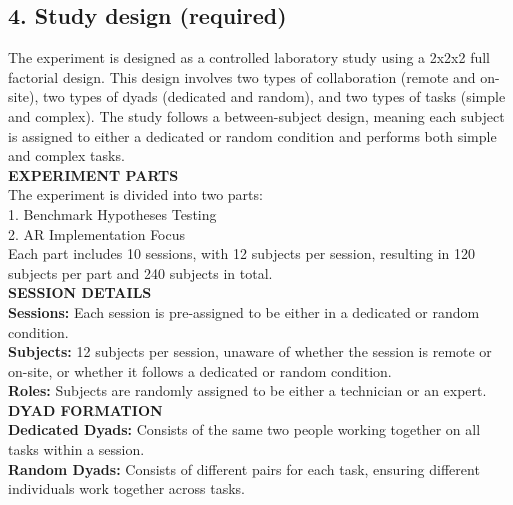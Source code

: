 \documentclass[A4,11pt]{article}
\renewcommand{\~}[1]{\tilde{#1}}
\renewcommand{\-}[1]{\overline{#1}}
\begin{document}
\subsection*{4. Study design (required) }
The experiment is designed as a controlled laboratory study using a 2x2x2 full factorial design. This design involves two types of collaboration (remote and on-site), two types of dyads (dedicated and random), and two types of tasks (simple and complex). The study follows a between-subject design, meaning each subject is assigned to either a dedicated or random condition and performs both simple and complex tasks.\\

\textbf{EXPERIMENT PARTS}\\
The experiment is divided into two parts:\\
1. Benchmark Hypotheses Testing\\
2. AR Implementation Focus\\

Each part includes 10 sessions, with 12 subjects per session, resulting in 120 subjects per part and 240 subjects in total.\\

\textbf{SESSION DETAILS}\\
\textbf{Sessions:} Each session is pre-assigned to be either in a dedicated or random condition.\\
\textbf{Subjects:} 12 subjects per session, unaware of whether the session is remote or on-site, or whether it follows a dedicated or random condition.\\
\textbf{Roles:} Subjects are randomly assigned to be either a technician or an expert.\\

\textbf{DYAD FORMATION}\\
\textbf{Dedicated Dyads:} Consists of the same two people working together on all tasks within a session.\\
\textbf{Random Dyads:} Consists of different pairs for each task, ensuring different individuals work together across tasks.\\
\end{document}
